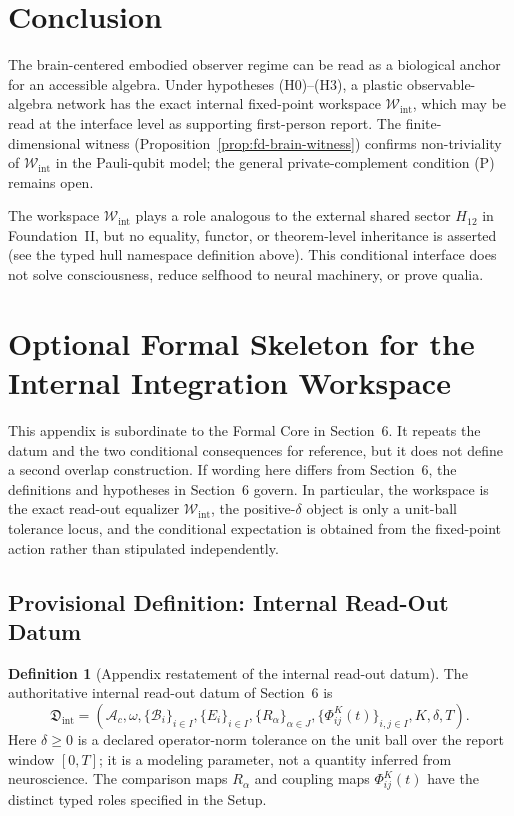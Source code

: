 \documentclass[12pt]{article}
\theoremstyle{definition}
\newtheorem{definition}[proposition]{Definition}
\theoremstyle{remark}
\newcommand{\Ac}{\mathcal A_c}
\newcommand{\Wint}{\mathcal W_{\mathrm{int}}}
\begin{document}
\section{Conclusion}

The brain-centered embodied observer regime can be read as a biological
anchor for an accessible algebra. Under hypotheses (H0)--(H3), a plastic
observable-algebra network has the exact internal fixed-point workspace
\(\Wint\), which may be read at the interface level as supporting
first-person report. The finite-dimensional witness
(Proposition~\ref{prop:fd-brain-witness}) confirms non-triviality of
\(\Wint\) in the Pauli-qubit model; the general private-complement
condition (P) remains open.

The workspace \(\Wint\) plays a role analogous to the external shared
sector \(H_{12}\) in Foundation~II, but no equality, functor, or
theorem-level inheritance is asserted (see the typed hull namespace
definition above). This conditional interface does not solve
consciousness, reduce selfhood to neural machinery, or prove qualia.

\appendix

\section{Optional Formal Skeleton for the Internal Integration Workspace}

This appendix is subordinate to the Formal Core in Section~6. It repeats
the datum and the two conditional consequences for reference, but it
does not define a second overlap construction. If wording here differs
from Section~6, the definitions and hypotheses in Section~6 govern. In
particular, the workspace is the exact read-out equalizer \(\Wint\), the
positive-\(\delta\) object is only a unit-ball tolerance locus, and the
conditional expectation is obtained from the fixed-point action rather
than stipulated independently.

\subsection{Provisional Definition: Internal Read-Out Datum}

\begin{definition}[Appendix restatement of the internal read-out datum]
The authoritative internal read-out datum of Section~6 is
\[
\mathfrak D_{\mathrm{int}}
=
(\Ac,\omega,\{\mathcal B_i\}_{i\in I},\{E_i\}_{i\in I},
\{R_\alpha\}_{\alpha\in J},
\{\Phi_{ij}^{K}(t)\}_{i,j\in I},K,\delta,T).
\]
Here \(\delta\geq0\) is a declared operator-norm tolerance on the unit
ball over the report window \([0,T]\); it is a modeling parameter, not a
quantity inferred from neuroscience. The comparison maps
\(R_\alpha\) and coupling maps \(\Phi_{ij}^{K}(t)\) have the distinct
typed roles specified in the Setup.
\end{definition}
\end{document}
